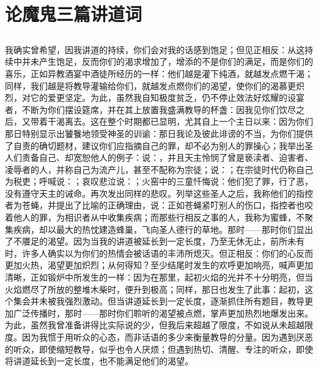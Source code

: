 
\chapter{论魔鬼三篇讲道词}



\section{}

\par

我确实曾希望，因我讲道的持续，你们会对我的话感到饱足；但见正相反：从这持续中并未产生饱足，反而你们的渴求增加了，增添的不是你们的满足，而是你们的喜乐，正如异教酒宴中酒徒所经历的一样：他们越是灌下纯酒，就越发点燃干渴；同样，我们越是将教导灌输给你们，就越发点燃你们的渴望，使你们的渴慕更炽烈，对它的爱更坚定。为此，虽然我自知极度贫乏，仍不停止效法好炫耀的设宴者，不断为你们摆设筵席，并在其上放置我盛满教导的杯盏：因我见你们饮尽之后，又带着干渴离去。这在整个时期都已显明，尤其自上一个主日以来：因为你们那日特别显示出饕餮地领受神圣的训谕：那日我论及彼此诽谤的不当，为你们提供了自责的确切题材，建议你们应指摘自己的罪，却不必为别人的罪操心；我举出圣人们责备自己、却宽恕他人的例子：说：，并且天主怜悯了曾是亵渎者、迫害者、凌辱者的人，并称自己为流产儿，甚至不配称为宗徒；说：；在宗徒时代仍称自己为税吏；呼喊说：；哀叹悲泣说：；火窑中的三童忏悔说：他们犯了罪，行了恶，没有遵守天主的诫命。再次发出同样的悲叹。列举这些圣人之后，我称他们的指控者为苍蝇，并提出了比喻的正确理由，说：正如苍蝇紧叮别人的伤口，指控者也咬着他人的罪，为相识者从中收集疾病；而那些行相反之事的人，我称为蜜蜂，不聚集疾病，却以最大的热忱建造蜂巢，飞向圣人德行的草地。那时——那时你们显出了不餍足的渴望。因为当我的讲道被延长到一定长度，乃至无休无止，前所未有时，许多人确实以为你们的热情会被话语的丰沛所熄灭。但正相反：你们的心反而更加火热，渴望更加炽烈；从何得知？至少结尾时发生的欢呼更加响亮，喊声更加清晰，正如锻炉中所发生的一样：因为在那里，起初火焰的光并不十分明亮，但当火焰燃尽了所放的整堆木柴时，便升到极高；同样，那日也发生了此事：起初，这个集会并未被我强烈激动。但当讲道延长到一定长度，逐渐抓住所有题目，教导更加广泛传播时，那时——那时你们聆听的渴望被点燃，掌声更加热烈地爆发出来。为此，虽然我曾准备讲得比实际说的少，但我后来超越了限度，不如说从未超越限度。因为我惯于用听众的心态，而非话语的多少来衡量教导的分量。因为遇到厌恶的听众，即使缩短教导，似乎也令人厌烦；但遇到热切、清醒、专注的听众，即使将讲道延长到一定长度，也不能满足他们的渴望。\par

